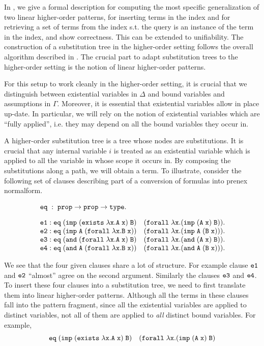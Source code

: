 \documentclass{acmconf}
\newcommand{\typeLF}{\tt{type}}
\newcommand{\propLF}{\tt{prop}}
\newcommand{\andLF}{\tt{and}\;}
\newcommand{\impLF}{\tt{imp}\;}
\newcommand{\forallLF}{\tt{forall}\;}
\newcommand{\existsLF}{\tt{exists}\;}
\newcommand{\eqLF}{\tt{eq}\;}
\newcommand{\eqilLF}{\tt{e1}}
\newcommand{\eqirLF}{\tt{e2}}
\newcommand{\eqalLF}{\tt{e3}}
\newcommand{\eqarLF}{\tt{e4}}
\begin{document}
 In \cite{Pientka:ICLP03,Pientka03phd}, we give a formal 
description for computing the most specific generalization of two
linear higher-order patterns, for inserting terms in the index and for
retrieving a set of terms from the index s.t. the query is an instance
of the term in the index, and show correctness. This can be extended
to unifiability. The construction of a substitution tree in the
higher-order setting follows the overall algorithm described in
\cite{Ramakrishnan01:indexing}. The crucial part to adapt substitution
trees to the higher-order setting is the notion of linear higher-order
patterns.

For this setup to work cleanly in the higher-order
setting, it is crucial that we distinguish between existential
variables in $\Delta$ and bound variables and assumptions in
$\Gamma$. Moreover, it is essential that existential variables allow
in place up-date. In particular, we will rely on the notion of
existential variables which are ``fully applied'', i.e. they may
depend on all the bound variables they occur in.

A higher-order substitution tree is a tree whose
nodes are substitutions. It is crucial that any internal variable $i$
is treated as an existential variable which is applied to all the
variable in whose scope it occurs in. By composing the substitutions along a path,
we will obtain a term. To illustrate, consider the following
set of clauses describing part of a conversion of formulas into prenex
normalform. 

\begin{small}
\[
\begin{array}{l}
\eqLF :\;  \propLF \rightarrow \propLF \rightarrow \typeLF.\\[1em]
%
\eqilLF: \eqLF (\impLF (\existsLF \lambda x. A\; x)\; B)\quad (\forallLF \lambda x. (\impLF (A\; x)\; B)).\\
\eqirLF: \eqLF (\impLF A\; (\forallLF \lambda x. B\;x)) \quad (\forallLF \lambda x. (\impLF A \; (B\; x))).\\
\eqalLF: \eqLF (\andLF (\forallLF \lambda x. A \;x) \; B)\quad (\forallLF \lambda x. (\andLF (A\; x)\; B)).\\
\eqarLF: \eqLF (\andLF A \; (\forallLF \lambda x. B\; x)) \quad (\forallLF \lambda x. (\andLF A \; (B\;x))).\\
\end{array}
\]
\end{small}

We see that the four given clauses share a lot of structure. For
example clause $\eqilLF$ and $\eqirLF$ ``almost'' agree on the second
argument. Similarly the clauses $\eqalLF$ and $\eqarLF$. To insert
these four clauses into a substitution tree, we need to first
translate them into linear higher-order patterns. Although all the
terms in these clauses fall into the pattern fragment, since all the
existential variables are applied to distinct variables, not all of
them are applied to {\em{all}} distinct bound variables. For example, 
\[
\eqLF (\impLF (\existsLF \lambda x. A\; x)\; B)\quad (\forallLF
\lambda x. (\impLF (A\; x)\; B)
\]
\end{document}
